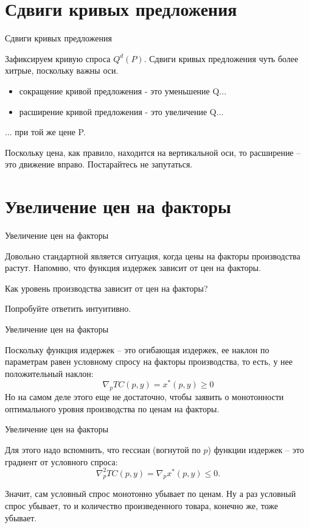 \documentclass{beamer}
\begin{document}
\section{Сдвиги кривых предложения}
\begin{frame}{Сдвиги кривых предложения}


Зафиксируем кривую спроса $Q^d(P)$. Сдвиги кривых предложения чуть более хитрые, поскольку важны оси.

\begin{itemize}
\item сокращение кривой предложения - это уменьшение Q...
\item расширение кривой предложения - это увеличение Q...
\end{itemize}

... при той же цене P.

Поскольку цена, как правило, находится на вертикальной оси, то расширение – это движение вправо. Постарайтесь не запутаться.
	
\end{frame}

\section{Увеличение цен на факторы}

\begin{frame}{Увеличение цен на факторы}
	
Довольно стандартной является ситуация, когда цены на факторы производства растут. Напомню, что функция издержек зависит от цен на факторы. 

Как уровень производства зависит от цен на факторы?

Попробуйте ответить интуитивно.
\end{frame}

\begin{frame}{Увеличение цен на факторы}
	
Поскольку функция издержек – это огибающая издержек, ее наклон по параметрам равен условному спросу на факторы производства, то есть, у нее положительный наклон:
$$ \nabla_p TC(p, y) = x^{\ast}(p, y) \geqslant 0$$
Но на самом деле этого еще не достаточно, чтобы заявить о монотонности оптимального уровня производства по ценам на факторы. 
\end{frame}

\begin{frame}{Увеличение цен на факторы}
	
Для этого надо вспомнить, что гессиан (вогнутой по $p$) функции издержек – это градиент от условного спроса:
$$ \nabla^2_p TC(p, y) = \nabla_p x^{\ast}(p, y) \leqslant 0.$$

Значит, сам условный спрос монотонно убывает по ценам. Ну а раз условный спрос убывает, то и количество произведенного товара, конечно же, тоже убывает.
	
\end{frame}
\end{document}
